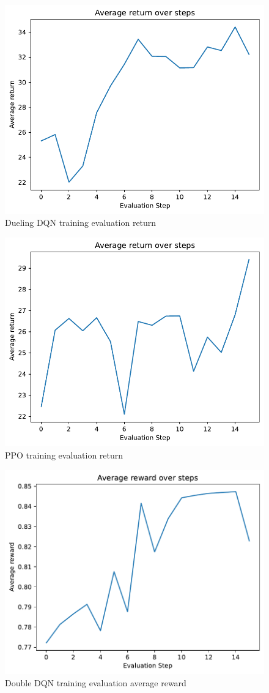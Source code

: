 \documentclass{article}
\begin{document}
\begin{figure}
    \centering
    \includegraphics[width=0.7\linewidth]{img/DuelDQN_training_eval_return.pdf}
    \caption{Dueling DQN training evaluation return}
    \label{fig:DuelDQN_eval_return_training}
\end{figure}

\begin{figure}
    \centering
    \includegraphics[width=0.7\linewidth]{img/PPO_training_eval_return.pdf}
    \caption{PPO training evaluation return}
    \label{fig:PPO_eval_return_training}
\end{figure}

\begin{figure}
    \centering
    \includegraphics[width=0.7\linewidth]{img/DQN_training_eval_avg_reward.pdf}
    \caption{Double DQN training evaluation average reward}
    \label{fig:DQN_eval_reward_training}
\end{figure}
\end{document}
